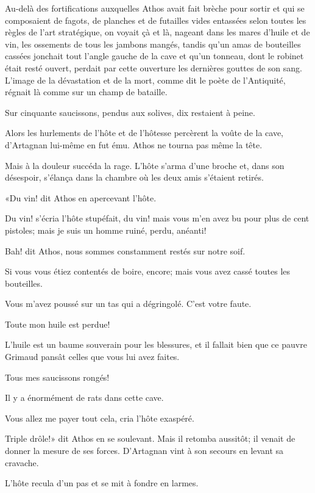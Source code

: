 Au-delà des fortifications auxquelles Athos avait fait brèche pour sortir et qui se composaient de fagots, de planches et de futailles vides entassées selon toutes les règles de l'art stratégique, on voyait çà et là, nageant dans les mares d'huile et de vin, les ossements de tous les jambons mangés, tandis qu'un amas de bouteilles cassées jonchait tout l'angle gauche de la cave et qu'un tonneau, dont le robinet était resté ouvert, perdait par cette ouverture les dernières gouttes de son sang. L'image de la dévastation et de la mort, comme dit le poète de l'Antiquité, régnait là comme sur un champ de bataille. 

Sur cinquante saucissons, pendus aux solives, dix restaient à peine. 

Alors les hurlements de l'hôte et de l'hôtesse percèrent la voûte de la cave, d'Artagnan lui-même en fut ému. Athos ne tourna pas même la tête. 

Mais à la douleur succéda la rage. L'hôte s'arma d'une broche et, dans son désespoir, s'élança dans la chambre où les deux amis s'étaient retirés. 

«Du vin! dit Athos en apercevant l'hôte. 

\speak  Du vin! s'écria l'hôte stupéfait, du vin! mais vous m'en avez bu pour plus de cent pistoles; mais je suis un homme ruiné, perdu, anéanti! 

\speak  Bah! dit Athos, nous sommes constamment restés sur notre soif. 

\speak  Si vous vous étiez contentés de boire, encore; mais vous avez cassé toutes les bouteilles. 

\speak  Vous m'avez poussé sur un tas qui a dégringolé. C'est votre faute. 

\speak  Toute mon huile est perdue! 

\speak  L'huile est un baume souverain pour les blessures, et il fallait bien que ce pauvre Grimaud pansât celles que vous lui avez faites. 

\speak  Tous mes saucissons rongés! 

\speak  Il y a énormément de rats dans cette cave. 

\speak  Vous allez me payer tout cela, cria l'hôte exaspéré. 

\speak  Triple drôle!» dit Athos en se soulevant. Mais il retomba aussitôt; il venait de donner la mesure de ses forces. D'Artagnan vint à son secours en levant sa cravache. 

L'hôte recula d'un pas et se mit à fondre en larmes. 

